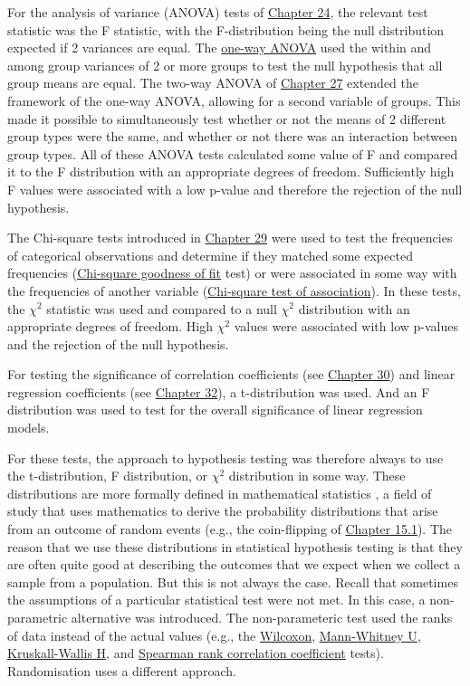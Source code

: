 \documentclass[
]{scrbook}
\begin{document}
For the analysis of variance (ANOVA) tests of \protect\hyperlink{Chapter_24}{Chapter 24}, the relevant test statistic was the F statistic, with the F-distribution being the null distribution expected if 2 variances are equal.
The \protect\hyperlink{one-way-anova}{one-way ANOVA} used the within and among group variances of 2 or more groups to test the null hypothesis that all group means are equal.
The two-way ANOVA of \protect\hyperlink{Chapter_27}{Chapter 27} extended the framework of the one-way ANOVA, allowing for a second variable of groups.
This made it possible to simultaneously test whether or not the means of 2 different group types were the same, and whether or not there was an interaction between group types.
All of these ANOVA tests calculated some value of F and compared it to the F distribution with an appropriate degrees of freedom.
Sufficiently high F values were associated with a low p-value and therefore the rejection of the null hypothesis.

The Chi-square tests introduced in \protect\hyperlink{Chapter_29}{Chapter 29} were used to test the frequencies of categorical observations and determine if they matched some expected frequencies (\protect\hyperlink{chi-squared-goodness-of-fit}{Chi-square goodness of fit} test) or were associated in some way with the frequencies of another variable (\protect\hyperlink{chi-squared-test-of-association}{Chi-square test of association}).
In these tests, the \(\chi^{2}\) statistic was used and compared to a null \(\chi^{2}\) distribution with an appropriate degrees of freedom.
High \(\chi^{2}\) values were associated with low p-values and the rejection of the null hypothesis.

For testing the significance of correlation coefficients (see \protect\hyperlink{Chapter_30}{Chapter 30}) and linear regression coefficients (see \protect\hyperlink{Chapter_32}{Chapter 32}), a t-distribution was used.
And an F distribution was used to test for the overall significance of linear regression models.

For these tests, the approach to hypothesis testing was therefore always to use the t-distribution, F distribution, or \(\chi^{2}\) distribution in some way.
These distributions are more formally defined in mathematical statistics \citep{Miller2004}, a field of study that uses mathematics to derive the probability distributions that arise from an outcome of random events (e.g., the coin-flipping of \protect\hyperlink{an-instructive-example}{Chapter 15.1}).
The reason that we use these distributions in statistical hypothesis testing is that they are often quite good at describing the outcomes that we expect when we collect a sample from a population.
But this is not always the case.
Recall that sometimes the assumptions of a particular statistical test were not met.
In this case, a non-parametric alternative was introduced.
The non-parameteric test used the ranks of data instead of the actual values (e.g., the \protect\hyperlink{wilcoxon-test}{Wilcoxon}, \protect\hyperlink{mann-whitney-u-test}{Mann-Whitney U}, \protect\hyperlink{Chapter_26}{Kruskall-Wallis H}, and \protect\hyperlink{spearman-rank-correlation-coefficient}{Spearman rank correlation coefficient} tests).
Randomisation uses a different approach.
\end{document}
